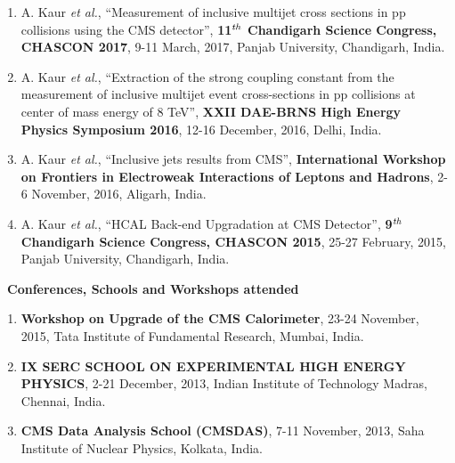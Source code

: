 \begin{itemize}
\begin{enumerate}
\item A. Kaur {\it et al.}, ``Measurement of inclusive multijet cross sections in pp collisions using the CMS detector'', {\bf 11$^{\rm \it th}$ Chandigarh Science Congress, CHASCON 2017}, 9-11 March, 2017, Panjab University, Chandigarh, India.  

\item A. Kaur {\it et al.}, ``Extraction of the strong coupling constant from the measurement of inclusive multijet event cross-sections in pp collisions at center of mass energy of 8 TeV'', {\bf XXII DAE­-BRNS High Energy Physics Symposium 2016}, 12-16 December, 2016, Delhi, India.

\item A. Kaur {\it et al.}, ``Inclusive jets results from CMS'', {\bf International Workshop on Frontiers in Electroweak Interactions of Leptons and Hadrons}, 2-6 November, 2016, Aligarh, India.

\item A. Kaur {\it et al.}, ``HCAL Back-end Upgradation at CMS Detector'', {\bf 9$^{\rm \it th}$ Chandigarh Science Congress, CHASCON 2015}, 25-27 February, 2015, Panjab University, Chandigarh, India.

\end{enumerate}
\vspace*{3mm}

{\Large \item {\bf ~Conferences, Schools and Workshops attended}}
\begin{enumerate}

\item {\bf Workshop on Upgrade of the CMS Calorimeter}, 23-24 November, 2015, Tata Institute of Fundamental Research, Mumbai, India.

\item {\bf IX SERC SCHOOL ON EXPERIMENTAL HIGH ENERGY PHYSICS}, 2-21 December, 2013, Indian Institute of Technology Madras, Chennai, India. 

\item {\bf CMS Data Analysis School (CMSDAS)}, 7-11 November, 2013, Saha Institute of Nuclear Physics, Kolkata, India.


\end{enumerate}
\end{itemize}
